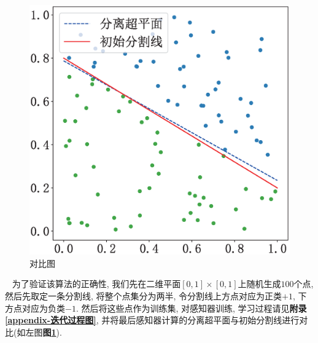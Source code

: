 \documentclass[12pt, a4paper, oneside]{ctexart}
\begin{document}
\begin{figure}
    \centering
    \includegraphics[scale=0.4]{对比图.eps}
    \caption{对比图}
    \label{figure-对比图}
\end{figure}
\ \newline
为了验证该算法的正确性, 我们先在二维平面$[0,1]\times[0,1]$上随机生成$100$个点, 然后先取定一条分割线, 将整个点集分为两半, 令分割线上方点对应为正类$+1$, 下方点对应为负类$-1$. 然后将这些点作为训练集, 对感知器训练, 学习过程请见\textbf{附录\ref{appendix-迭代过程图}}, 并将最后感知器计算的分离超平面与初始分割线进行对比(如左图\textbf{图\ref{figure-对比图}}).
\newline
\newline
\newline
\newline
\end{document}
